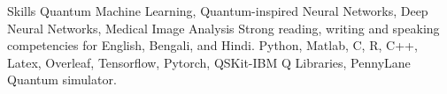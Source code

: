 
\begin{rubric}{Skills}
Quantum Machine Learning, Quantum-inspired Neural Networks, Deep Neural Networks, Medical Image Analysis
\entry*[Languages]
	Strong reading, writing and speaking competencies for English, Bengali, and Hindi.
	Python, Matlab, C, R, C++, Latex, Overleaf, Tensorflow, Pytorch, QSKit-IBM Q Libraries, PennyLane Quantum simulator.
\end{rubric}

